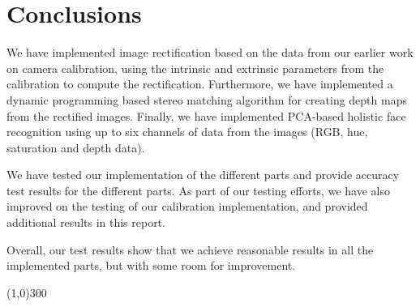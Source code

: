 
\section{Conclusions}
\label{sec:conclusions}
We have implemented image rectification based on the data from our earlier work
on camera calibration, using the intrinsic and extrinsic parameters from the
calibration to compute the rectification. Furthermore, we have implemented a
dynamic programming based stereo matching algorithm for creating depth maps from
the rectified images. Finally, we have implemented PCA-based holistic face
recognition using up to six channels of data from the images (RGB, hue,
saturation and depth data).

We have tested our implementation of the different parts and provide accuracy
test results for the different parts. As part of our testing efforts, we have
also improved on the testing of our calibration implementation, and provided
additional results in this report.

Overall, our test results show that we achieve reasonable results in all the
implemented parts, but with some room for improvement.

\begin{center}
\line(1,0){300}
\end{center}
